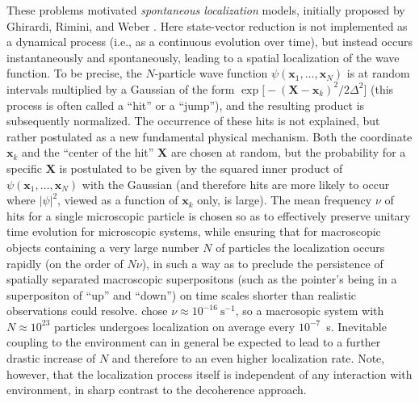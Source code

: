 \documentclass[rmp,aps,amsmath,amsfonts,noshowkeys,noshowpacs,12pt]{revtex4}
\begin{document}
These problems motivated {\em spontaneous localization} models,
initially proposed by Ghirardi, Rimini, and Weber
\citep[GRW;][]{Ghirardi:1986:ud}. Here state-vector reduction is not
implemented as a dynamical process (i.e., as a continuous evolution
over time), but instead occurs instantaneously and spontaneously,
leading to a spatial localization of the wave function. To be precise,
the $N$-particle wave function $\psi(\mathbf{x}_1, \hdots,
\mathbf{x}_N)$ is at random intervals multiplied by a Gaussian of the
form $\exp \bigl[ -(\mathbf{X}-\mathbf{x}_k)^2 / 2\Delta^2 \bigr]$
(this process is often called a ``hit'' or a ``jump''), and the
resulting product is subsequently normalized.  The occurrence of these
hits is not explained, but rather postulated as a new fundamental
physical mechanism. Both the coordinate $\mathbf{x}_k$ and the
``center of the hit'' $\mathbf{X}$ are chosen at random, but the
probability for a specific $\mathbf{X}$ is postulated to be given by
the squared inner product of $\psi(\mathbf{x}_1, \hdots,
\mathbf{x}_N)$ with the Gaussian (and therefore hits are more likely
to occur where $|\psi|^2$, viewed as a function of $\mathbf{x}_k$
only, is large).  The mean frequency $\nu$ of hits for a single
microscopic particle is chosen so as to effectively preserve unitary
time evolution for microscopic systems, while ensuring that for
macroscopic objects containing a very large number $N$ of particles
the localization occurs rapidly (on the order of $N\nu$), in such a
way as to preclude the persistence of spatially separated macroscopic
superpositons (such as the pointer's being in a superpositon of ``up''
and ``down'') on time scales shorter than realistic observations could
resolve. \citet{Ghirardi:1986:ud} chose $\nu \approx
10^{-16}~\text{s}^{-1}$, so a macrosopic system with $N \approx
10^{23}$ particles undergoes localization on average every
$10^{-7}$~s.  Inevitable coupling to the environment can in
general be expected to lead to a further drastic increase of $N$ and
therefore to an even higher localization rate. Note, however, that the
localization process itself is independent of any interaction
with environment, in sharp contrast to the decoherence approach.
\end{document}
